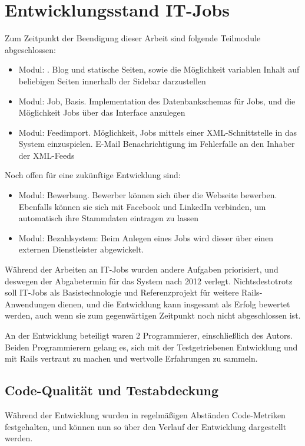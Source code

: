 \section{Entwicklungsstand IT-Jobs}
Zum Zeitpunkt der Beendigung dieser Arbeit sind folgende Teilmodule abgeschlossen:
\begin{itemize}
 \item Modul: . Blog und statische Seiten, sowie die Möglichkeit variablen Inhalt auf beliebigen Seiten innerhalb der Sidebar darzustellen
 \item Modul: Job, Basis. Implementation des Datenbankschemas für Jobs, und die Möglichkeit Jobs über das Interface anzulegen
 \item Modul: Feedimport. Möglichkeit, Jobs mittels einer XML-Schnittstelle in das System einzuspielen. E-Mail Benachrichtigung im Fehlerfalle an den Inhaber der XML-Feeds
\end{itemize}
Noch offen für eine zukünftige Entwicklung sind:
\begin{itemize}
 \item Modul: Bewerbung. Bewerber können sich über die Webseite bewerben. Ebenfalls können sie sich mit Facebook und LinkedIn verbinden, um automatisch ihre Stammdaten eintragen zu lassen
 \item Modul: Bezahlsystem: Beim Anlegen eines Jobs wird dieser über einen externen Dienstleister abgewickelt.
\end{itemize}

Während der Arbeiten an IT-Jobs wurden andere Aufgaben priorisiert, und deswegen der Abgabetermin für das System nach 2012 verlegt. Nichtsdestotrotz soll IT-Jobs als Basistechnologie und Referenzprojekt für weitere Rails-Anwendungen dienen, und die Entwicklung kann insgesamt als Erfolg bewertet werden, auch wenn sie zum gegenwärtigen Zeitpunkt noch nicht abgeschlossen ist.

An der Entwicklung beteiligt waren 2 Programmierer, einschließlich des Autors. Beiden Programmierern gelang es, sich mit der Testgetriebenen Entwicklung und mit Rails vertraut zu machen und wertvolle Erfahrungen zu sammeln.

\subsection*{Code-Qualität und Testabdeckung}
Während der Entwicklung wurden in regelmäßigen Abständen Code-Metriken festgehalten, und können nun so über den Verlauf der Entwicklung dargestellt werden.

